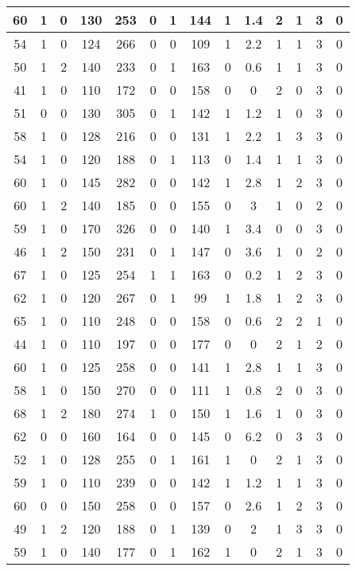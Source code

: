 \documentclass{article}
\begin{document}
\begin{longtable}{|c|c|c|c|c|c|c|c|c|c|c|c|c|c|}
60 & 1 & 0 & 130 & 253 & 0 & 1 & 144 & 1 & 1.4 & 2 & 1 & 3 & 0 \\ \hline
54 & 1 & 0 & 124 & 266 & 0 & 0 & 109 & 1 & 2.2 & 1 & 1 & 3 & 0 \\ \hline
50 & 1 & 2 & 140 & 233 & 0 & 1 & 163 & 0 & 0.6 & 1 & 1 & 3 & 0 \\ \hline
41 & 1 & 0 & 110 & 172 & 0 & 0 & 158 & 0 & 0 & 2 & 0 & 3 & 0 \\ \hline
51 & 0 & 0 & 130 & 305 & 0 & 1 & 142 & 1 & 1.2 & 1 & 0 & 3 & 0 \\ \hline
58 & 1 & 0 & 128 & 216 & 0 & 0 & 131 & 1 & 2.2 & 1 & 3 & 3 & 0 \\ \hline
54 & 1 & 0 & 120 & 188 & 0 & 1 & 113 & 0 & 1.4 & 1 & 1 & 3 & 0 \\ \hline
60 & 1 & 0 & 145 & 282 & 0 & 0 & 142 & 1 & 2.8 & 1 & 2 & 3 & 0 \\ \hline
60 & 1 & 2 & 140 & 185 & 0 & 0 & 155 & 0 & 3 & 1 & 0 & 2 & 0 \\ \hline
59 & 1 & 0 & 170 & 326 & 0 & 0 & 140 & 1 & 3.4 & 0 & 0 & 3 & 0 \\ \hline
46 & 1 & 2 & 150 & 231 & 0 & 1 & 147 & 0 & 3.6 & 1 & 0 & 2 & 0 \\ \hline
67 & 1 & 0 & 125 & 254 & 1 & 1 & 163 & 0 & 0.2 & 1 & 2 & 3 & 0 \\ \hline
62 & 1 & 0 & 120 & 267 & 0 & 1 & 99 & 1 & 1.8 & 1 & 2 & 3 & 0 \\ \hline
65 & 1 & 0 & 110 & 248 & 0 & 0 & 158 & 0 & 0.6 & 2 & 2 & 1 & 0 \\ \hline
44 & 1 & 0 & 110 & 197 & 0 & 0 & 177 & 0 & 0 & 2 & 1 & 2 & 0 \\ \hline
60 & 1 & 0 & 125 & 258 & 0 & 0 & 141 & 1 & 2.8 & 1 & 1 & 3 & 0 \\ \hline
58 & 1 & 0 & 150 & 270 & 0 & 0 & 111 & 1 & 0.8 & 2 & 0 & 3 & 0 \\ \hline
68 & 1 & 2 & 180 & 274 & 1 & 0 & 150 & 1 & 1.6 & 1 & 0 & 3 & 0 \\ \hline
62 & 0 & 0 & 160 & 164 & 0 & 0 & 145 & 0 & 6.2 & 0 & 3 & 3 & 0 \\ \hline
52 & 1 & 0 & 128 & 255 & 0 & 1 & 161 & 1 & 0 & 2 & 1 & 3 & 0 \\ \hline
59 & 1 & 0 & 110 & 239 & 0 & 0 & 142 & 1 & 1.2 & 1 & 1 & 3 & 0 \\ \hline
60 & 0 & 0 & 150 & 258 & 0 & 0 & 157 & 0 & 2.6 & 1 & 2 & 3 & 0 \\ \hline
49 & 1 & 2 & 120 & 188 & 0 & 1 & 139 & 0 & 2 & 1 & 3 & 3 & 0 \\ \hline
59 & 1 & 0 & 140 & 177 & 0 & 1 & 162 & 1 & 0 & 2 & 1 & 3 & 0 \\ \hline

\end{longtable}
\end{document}
